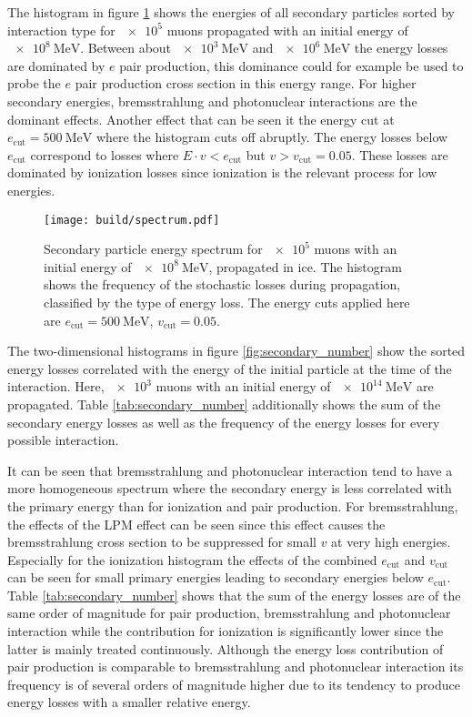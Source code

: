 The histogram in figure \ref{fig:spectrum} shows the energies of all secondary particles sorted by interaction type for $\num{e5}$ muons propagated with an initial energy of $\SI{e8}{\mega\electronvolt}$.
Between about $\SI{e3}{\mega\electronvolt}$ and $\SI{e6}{\mega\electronvolt}$ the energy losses are dominated by $e$ pair production, this dominance could for example be used to probe the $e$ pair production cross section in this energy range.
For higher secondary energies, bremsstrahlung and photonuclear interactions are the dominant effects.
Another effect that can be seen it the energy cut at $e_\text{cut} = \SI{500}{\mega\electronvolt}$ where the histogram cuts off abruptly.
The energy losses below $e_\text{cut}$ correspond to losses where $E \cdot v < e_\text{cut}$ but $v > v_\text{cut} = 0.05$.
These losses are dominated by ionization losses since ionization is the relevant process for low energies.

\begin{figure}
    \centering
    \texttt{[image: build/spectrum.pdf]}
    \caption{Secondary particle energy spectrum for $\num{e5}$ muons with an initial energy of $\SI{e8}{\mega\electronvolt}$, propagated in ice. The histogram shows the frequency of the stochastic losses during propagation, classified by the type of energy loss. The energy cuts applied here are $e_\text{cut} = \SI{500}{\mega\electronvolt}$, $v_\text{cut} = 0.05$.}
    \label{fig:spectrum}
\end{figure}

The two-dimensional histograms in figure \ref{fig:secondary_number} show the sorted energy losses correlated with the energy of the initial particle at the time of the interaction.
Here, $\num{e3}$ muons with an initial energy of $\SI{e14}{\mega\electronvolt}$ are propagated.
Table \ref{tab:secondary_number} additionally shows the sum of the secondary energy losses as well as the frequency of the energy losses for every possible interaction.

It can be seen that bremsstrahlung and photonuclear interaction tend to have a more homogeneous spectrum where the secondary energy is less correlated with the primary energy than for ionization and pair production.
For bremsstrahlung, the effects of the LPM effect can be seen since this effect causes the bremsstrahlung cross section to be suppressed for small $v$ at very high energies.
Especially for the ionization histogram the effects of the combined $e_\text{cut}$ and $v_\text{cut}$ can be seen for small primary energies leading to secondary energies below $e_\text{cut}$.
Table \ref{tab:secondary_number} shows that the sum of the energy losses are of the same order of magnitude for pair production, bremsstrahlung and photonuclear interaction while the contribution for ionization is significantly lower since the latter is mainly treated continuously.
Although the energy loss contribution of pair production is comparable to bremsstrahlung and photonuclear interaction its frequency is of several orders of magnitude higher due to its tendency to produce energy losses with a smaller relative energy.

